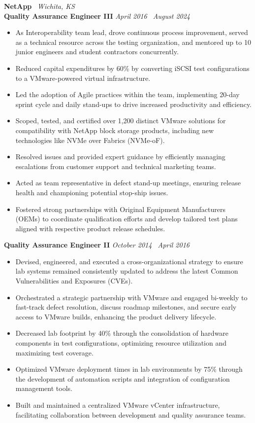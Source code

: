 \documentclass[10pt]{article}       %
\begin{document}
\textbf{NetApp} \hfill\ \textit{Wichita, KS} \\
\vspace{1pt}
\textbf{Quality Assurance Engineer III} \hfill \textit{April 2016 \textendash\ August 2024} \\
\vspace{-6.5pt}
\begin{itemize}
  \item As Interoperability team lead, drove continuous process improvement, served as a technical resource across the testing organization, and mentored up to 10 junior engineers and student contractors concurrently.
  \item Reduced capital expenditures by 60\% by converting iSCSI test configurations to a VMware-powered virtual infrastructure.
  \item Led the adoption of Agile practices within the team, implementing 20-day sprint cycle and daily stand-ups to drive increased productivity and efficiency.
  \item Scoped, tested, and certified over 1,200 distinct VMware solutions for compatibility with NetApp block storage products, including new technologies like NVMe over Fabrics (NVMe-oF).
  \item Resolved issues and provided expert guidance by efficiently managing escalations from customer support and technical marketing teams.
  \item Acted as team representative in defect stand-up meetings, ensuring release health and championing potential stop-ship issues.
  \item Fostered strong partnerships with Original Equipment Manufacturers (OEMs) to coordinate qualification efforts and develop tailored test plans aligned with respective product release schedules.
\end{itemize}

\textbf{Quality Assurance Engineer II} \hfill \textit{October 2014 \textendash\ April 2016} \\
\vspace{-6.5pt}
\begin{itemize}
  \item Devised, engineered, and executed a cross-organizational strategy to ensure lab systems remained consistently updated to address the latest Common Vulnerabilities and Exposures (CVEs).
  \item Orchestrated a strategic partnership with VMware and engaged bi-weekly to fast-track defect resolution, discuss roadmap milestones, and secure early access to VMware builds, enhancing the product delivery lifecycle.
  \item Decreased lab footprint by 40\% through the consolidation of hardware components in test configurations, optimizing resource utilization and maximizing test coverage.
  \item Optimized VMware deployment times in lab environments by 75\% through the development of automation scripts and integration of configuration management tools.
  \item Built and maintained a centralized VMware vCenter infrastructure, facilitating collaboration between development and quality assurance teams.
\end{itemize}
\end{document}
